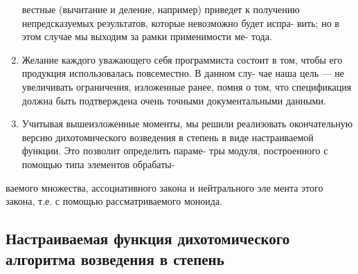 \begin{enumerate}
вестные (вычитание и деление, например) приведет к получению\linebreak
непредсказуемых результатов, которые невозможно будет испра­-\linebreak
вить; но в этом случае мы выходим за рамки применимости ме­-\linebreak
тода.
\item Желание каждого уважающего себя программиста состоит в том,\linebreak
чтобы его продукция использовалась повсеместно. В данном слу­-\linebreak
чае наша цель — не увеличивать ограничения, изложенные ранее,\linebreak
помня о том, что спецификация должна быть подтверждена очень\linebreak
точными документальными данными.
\item Учитывая вышеизложенные моменты, мы решили реализовать\linebreak
окончательную версию дихотомического возведения в степень в\linebreak
виде настраиваемой функции. Это позволит определить параме­-\linebreak
тры модуля, построенного с помощью типа элементов обрабаты-\linebreak
\end{enumerate}
\newpage

\begin{center}
\parbox{12cm}{
ваемого множества, ассоциативного закона и нейтрального эле­
мента этого закона, т.е. с помощью рассматриваемого моноида.
}
\end{center}


\subsection{ Настраиваемая функция дихотомического алгоритма возведения в степень}

